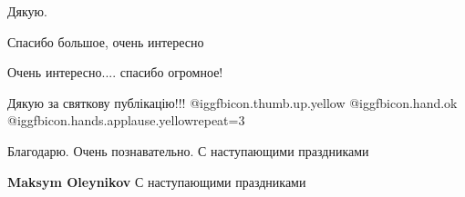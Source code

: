 \begin{itemize}
Дякую.

Спасибо большое, очень интересно

Очень интересно.... спасибо огромное!


Дякую за святкову публікацію!!! 
@igg{fbicon.thumb.up.yellow}  @igg{fbicon.hand.ok}
@igg{fbicon.hands.applause.yellow}{repeat=3} 

Благодарю. Очень познавательно. С наступающими праздниками

\textbf{Maksym Oleynikov} С наступающими праздниками


\end{itemize} %
